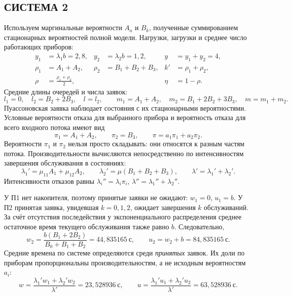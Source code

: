 \documentclass[11pt,a4paper]{article}
\newcommand{\secs}{\text{с}}
\begin{document}
\subsection{СИСТЕМА 2}
Используем маргинальные вероятности $A_a$ и $B_k$, полученные суммированием стационарных вероятностей полной модели. Нагрузки, загрузки и среднее число работающих приборов:
\begin{align}
y_1&=\lambda_1b=2{,}8,&y_2&=\lambda_2b=1{,}2,&y&=y_1+y_2=4,\\
\rho_1&=A_1+A_2,&\rho_2&=B_1+B_2+B_3,&k'&=\rho_1+\rho_2,\\
\rho&=\frac{\rho_1+\rho_2}{2},&&&\eta&=1-\rho.
\end{align}
Средние длины очередей и числа заявок:
\begin{equation}
l_1=0,\quad l_2=B_2+2B_3,\quad l=l_2,\qquad
m_1=A_1+A_2,\quad m_2=B_1+2B_2+3B_3,\quad m=m_1+m_2.
\end{equation}
Пуассоновская заявка наблюдает состояния с их стационарными вероятностями. Условные вероятности отказа для выбранного прибора и вероятность отказа для всего входного потока имеют вид
\begin{equation}
\pi_1=A_1+A_2,\qquad \pi_2=B_3,\qquad
\pi=a_1\pi_1+a_2\pi_2.
\end{equation}
Вероятности $\pi_1$ и $\pi_2$ нельзя просто складывать: они относятся к разным частям потока. Производительности вычисляются непосредственно по интенсивностям завершения обслуживания в состояниях:
\begin{equation}
\lambda_1'=\mu_{11}A_1+\mu_{12}A_2,\qquad
\lambda_2'=\mu(B_1+B_2+B_3),\qquad
\lambda'=\lambda_1'+\lambda_2'.
\end{equation}
Интенсивности отказов равны $\lambda_i''=\lambda_i\pi_i$, $\lambda''=\lambda_1''+\lambda_2''$.

У П1 нет накопителя, поэтому принятые заявки не ожидают: $w_1=0$, $u_1=b$. У П2 принятая заявка, увидевшая $k=0,1,2$, ожидает завершения $k$ обслуживаний. За счёт отсутствия последействия у экспоненциального распределения среднее остаточное время текущего обслуживания также равно $b$. Следовательно,
\begin{equation}
w_2=\frac{b(B_1+2B_2)}{B_0+B_1+B_2}=44{,}835165\ \secs,\qquad
u_2=w_2+b=84{,}835165\ \secs.
\end{equation}
Средние времена по системе определяются среди \emph{принятых} заявок. Их доли по приборам пропорциональны производительностям, а не исходным вероятностям $a_i$:
\begin{equation}
w=\frac{\lambda_1'w_1+\lambda_2'w_2}{\lambda'}=23{,}528936\ \secs,\qquad
u=\frac{\lambda_1'u_1+\lambda_2'u_2}{\lambda'}=63{,}528936\ \secs.
\end{equation}
\end{document}
